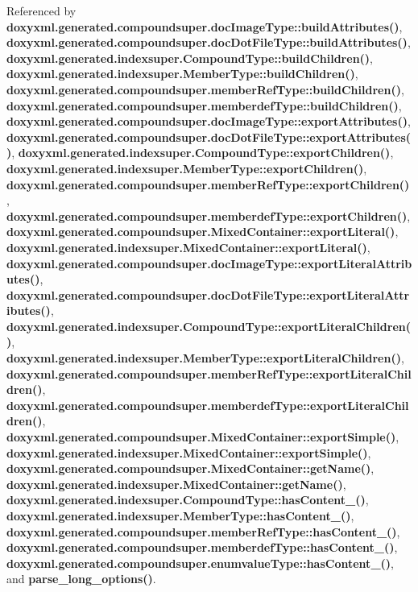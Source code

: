 Referenced by {\bf doxyxml.\+generated.\+compoundsuper.\+doc\+Image\+Type\+::build\+Attributes()}, {\bf doxyxml.\+generated.\+compoundsuper.\+doc\+Dot\+File\+Type\+::build\+Attributes()}, {\bf doxyxml.\+generated.\+indexsuper.\+Compound\+Type\+::build\+Children()}, {\bf doxyxml.\+generated.\+indexsuper.\+Member\+Type\+::build\+Children()}, {\bf doxyxml.\+generated.\+compoundsuper.\+member\+Ref\+Type\+::build\+Children()}, {\bf doxyxml.\+generated.\+compoundsuper.\+memberdef\+Type\+::build\+Children()}, {\bf doxyxml.\+generated.\+compoundsuper.\+doc\+Image\+Type\+::export\+Attributes()}, {\bf doxyxml.\+generated.\+compoundsuper.\+doc\+Dot\+File\+Type\+::export\+Attributes()}, {\bf doxyxml.\+generated.\+indexsuper.\+Compound\+Type\+::export\+Children()}, {\bf doxyxml.\+generated.\+indexsuper.\+Member\+Type\+::export\+Children()}, {\bf doxyxml.\+generated.\+compoundsuper.\+member\+Ref\+Type\+::export\+Children()}, {\bf doxyxml.\+generated.\+compoundsuper.\+memberdef\+Type\+::export\+Children()}, {\bf doxyxml.\+generated.\+compoundsuper.\+Mixed\+Container\+::export\+Literal()}, {\bf doxyxml.\+generated.\+indexsuper.\+Mixed\+Container\+::export\+Literal()}, {\bf doxyxml.\+generated.\+compoundsuper.\+doc\+Image\+Type\+::export\+Literal\+Attributes()}, {\bf doxyxml.\+generated.\+compoundsuper.\+doc\+Dot\+File\+Type\+::export\+Literal\+Attributes()}, {\bf doxyxml.\+generated.\+indexsuper.\+Compound\+Type\+::export\+Literal\+Children()}, {\bf doxyxml.\+generated.\+indexsuper.\+Member\+Type\+::export\+Literal\+Children()}, {\bf doxyxml.\+generated.\+compoundsuper.\+member\+Ref\+Type\+::export\+Literal\+Children()}, {\bf doxyxml.\+generated.\+compoundsuper.\+memberdef\+Type\+::export\+Literal\+Children()}, {\bf doxyxml.\+generated.\+compoundsuper.\+Mixed\+Container\+::export\+Simple()}, {\bf doxyxml.\+generated.\+indexsuper.\+Mixed\+Container\+::export\+Simple()}, {\bf doxyxml.\+generated.\+compoundsuper.\+Mixed\+Container\+::get\+Name()}, {\bf doxyxml.\+generated.\+indexsuper.\+Mixed\+Container\+::get\+Name()}, {\bf doxyxml.\+generated.\+indexsuper.\+Compound\+Type\+::has\+Content\+\_\+()}, {\bf doxyxml.\+generated.\+indexsuper.\+Member\+Type\+::has\+Content\+\_\+()}, {\bf doxyxml.\+generated.\+compoundsuper.\+member\+Ref\+Type\+::has\+Content\+\_\+()}, {\bf doxyxml.\+generated.\+compoundsuper.\+memberdef\+Type\+::has\+Content\+\_\+()}, {\bf doxyxml.\+generated.\+compoundsuper.\+enumvalue\+Type\+::has\+Content\+\_\+()}, and {\bf parse\+\_\+long\+\_\+options()}.

